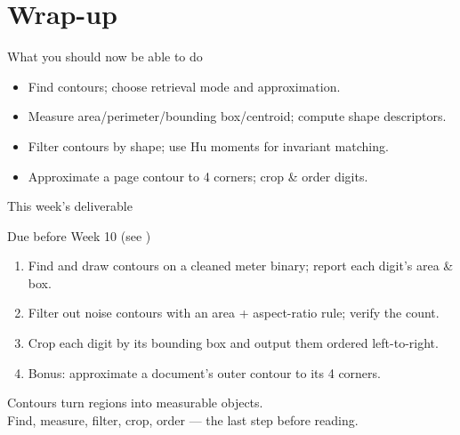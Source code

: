 \documentclass[10pt,aspectratio=169]{beamer}
\begin{document}
\section{Wrap-up}

\begin{frame}{What you should now be able to do}
  \begin{itemize}
    \item Find contours; choose retrieval mode and approximation.
    \item Measure area/perimeter/bounding box/centroid; compute shape descriptors.
    \item Filter contours by shape; use Hu moments for invariant matching.
    \item Approximate a page contour to 4 corners; crop \& order digits.
  \end{itemize}
\end{frame}

\begin{frame}{This week's deliverable}
  \begin{alertblock}{Due before Week 10 (see )}
    \begin{enumerate}
      \item Find and draw contours on a cleaned meter binary; report each digit's area \& box.
      \item Filter out noise contours with an area + aspect-ratio rule; verify the count.
      \item Crop each digit by its bounding box and output them ordered left-to-right.
      \item Bonus: approximate a document's outer contour to its 4 corners.
    \end{enumerate}
  \end{alertblock}
\end{frame}

\begin{frame}[standout]
  Contours turn regions into measurable objects.\\[4pt]
  \normalsize Find, measure, filter, crop, order — the last step before reading.
\end{frame}
\end{document}
